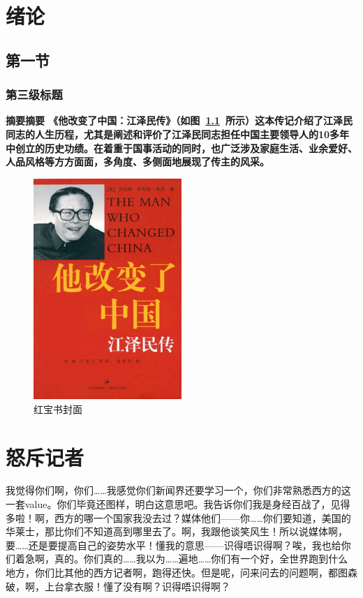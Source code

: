 \baselineskip=20pt
\chapter{绪论}
\section{第一节}
\subsection{第三级标题}
\bfseries{摘要}摘要
《他改变了中国：江泽民传》（如图~\ref{book}~所示）这本传记介绍了江泽民同志的人生历程，尤其是阐述和评价了江泽民同志担任中国主要领导人的10多年中创立的历史功绩。在着重于国事活动的同时，也广泛涉及家庭生活、业余爱好、人品风格等方方面面，多角度、多侧面地展现了传主的风采。

	\begin{figure}[htbp!]
		\centering
		\includegraphics[width=0.5\textwidth]{figures/The_Man_Who_Changed_China.png}
		\caption{红宝书封面}\label{book}
		\vspace{-1em}
	\end{figure}	



\chapter{怒斥记者}
我觉得你们啊，你们……我感觉你们新闻界还要学习一个，你们非常熟悉西方的这一套value。你们毕竟还图样，明白这意思吧。我告诉你们我是身经百战了，见得多啦！啊，西方的哪一个国家我没去过？媒体他们——你……你们要知道，美国的华莱士，那比你们不知道高到哪里去了。啊，我跟他谈笑风生！所以说媒体啊，要……还是要提高自己的姿势水平！懂我的意思——识得唔识得啊？唉，我也给你们着急啊，真的。你们真的……我以为……遍地……你们有一个好，全世界跑到什么地方，你们比其他的西方记者啊，跑得还快。但是呢，问来问去的问题啊，都图森破，啊，上台拿衣服！懂了没有啊？识得唔识得啊？

